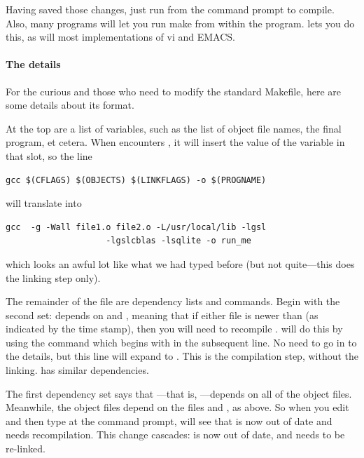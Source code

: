 \documentclass[12pt]{article}
\def\ind#1{\index{#1}#1}
\begin{document}
Having saved those changes, just run
 from the command prompt to compile.
Also, many programs will let you run
make from within the program.  lets you do this,
as will most implementations of \ind{vi} and \ind{EMACS}.


\paragraph{The details} For the curious and those who need to modify
the standard Makefile, here are some details about its format.

At the top are a list of variables, such as the list of object file names, the final program, et cetera.
When  encounters , it will insert the value of the variable  in that
slot, so the line 
\begin{lstlisting}
gcc $(CFLAGS) $(OBJECTS) $(LINKFLAGS) -o $(PROGNAME)
\end{lstlisting}
will translate into
\begin{lstlisting}
gcc  -g -Wall file1.o file2.o -L/usr/local/lib -lgsl 
                    -lgslcblas -lsqlite -o run_me
\end{lstlisting}
which looks an awful lot like what we had typed before (but not quite---this does the linking step only).

The remainder of the file are dependency lists and commands. Begin
with the second set:  depends on  and , meaning that if either file is newer than 
(as indicated by the time stamp), then you will need to recompile .  will do this by using the command which begins with
 in the subsequent line. No need to go in to the details, but
this line will expand to . This
is the compilation step, without the linking.  has similar
dependencies.

The first dependency set says that ---that is, ---depends on all of the object files. Meanwhile, the object files
depend on the  files and , as above. So when
you edit  and then type  at the command prompt,
 will see that  is now out of date and needs
recompilation. This change cascades:  is now out of date,
and needs to be re-linked.
\end{document}
